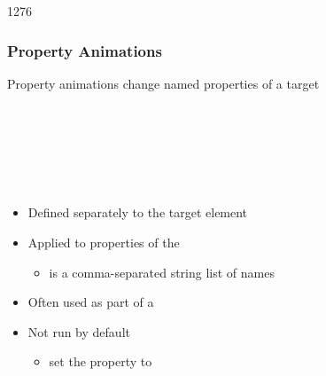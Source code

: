 \begin{slide}{1276}\frametitle{Property Animations}

Property animations change named properties of a target

\vspace*{0.5em}
\begin{qml}
\\
\\
\\
\\
\\
\qtt{\}}
\end{qml}

\vspace*{0.5em}
\begin{itemize}
\item Defined separately to the target element
\item Applied to properties of the 
  \begin{itemize}
  \item {} is a comma-separated string list of names
  \end{itemize}
\item Often used as part of a 
\item Not run by default
  \begin{itemize}
  \item set the  property to 
  \end{itemize}
\end{itemize}




\end{slide}

